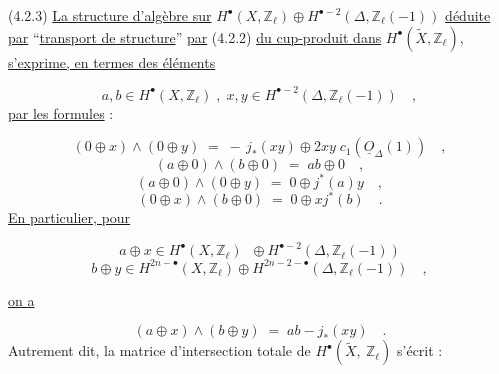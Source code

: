 (4.2.3) \underline{La structure d'algèbre sur} $H^{\bullet}(X,\mathbb{Z}_{\ell}) \oplus H^{\bullet-2}(\Delta,\mathbb{Z}_{\ell}(-1))$ \underline{déduite par} ``\underline{transport de structure}'' \underline{par} (4.2.2) \underline{du cup-produit dans} $H^{\bullet}(\widetilde{X},\mathbb{Z}_{\ell})$, \underline{s'exprime, en termes des éléments}

\begin{equation*}
a,b \in H^{\bullet}(X,\mathbb{Z}_{\ell}) \;,\; x,y \in H^{\bullet-2}(\Delta,\mathbb{Z}_{\ell}(-1)) \quad ,
\end{equation*}
\underline{par les formules} :

\begin{equation}\tag{4.2.3.1}
(0 \oplus x) \wedge (0 \oplus y) \;=\; -\, j_{*}(xy) \oplus 2xy \; c_{1}(\underline{O}_{\Delta}(1)) \quad ,
\end{equation}
\begin{equation}\tag{4.2.3.2}
(a \oplus 0) \wedge (b \oplus 0) \;=\; ab \oplus 0 \quad ,
\end{equation}
\begin{equation}\tag{4.2.3.3}
(a \oplus 0) \wedge (0 \oplus y) \;=\; 0 \oplus j^{*}(a)y \quad ,
\end{equation}
\begin{equation}\tag{4.2.3.4}
(0 \oplus x) \wedge (b \oplus 0) \;=\; 0 \oplus xj^{*}(b) \quad .
\end{equation}
\underline{En particulier, pour}

\begin{equation*}
a \oplus x \in H^{\bullet}(X,\mathbb{Z}_{\ell}) \;\; \oplus H^{\bullet-2}(\Delta,\mathbb{Z}_{\ell}(-1))
\end{equation*}
\begin{equation*}
b \oplus y \in H^{2n-\bullet}(X,\mathbb{Z}_{\ell}) \oplus H^{2n-2-\bullet}(\Delta,\mathbb{Z}_{\ell}(-1)) \quad , 
\end{equation*}


 \underline{on a}

\begin{equation}\tag{4.2.3.5}
(a \oplus x) \wedge (b \oplus y) \;=\; ab - j_{*}(xy) \quad .
\end{equation}
Autrement dit, la matrice d'intersection totale de $H^{\bullet}(\widetilde{X},\ \mathbb{Z}_{\ell})$ s'écrit :

